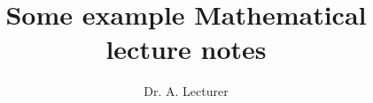 \documentclass[a4paper,twoside]{book}
\begin{document}
\title{Some example Mathematical lecture notes}
\author{Dr. A. Lecturer}

\maketitle
\tableofcontents

\frontmatter


\mainmatter





\end{document}
